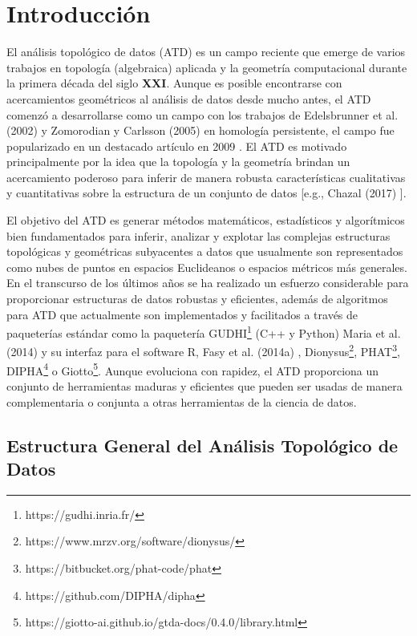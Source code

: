 \chapter*{Introducci\'on}

El an\'alisis topol\'ogico de datos (ATD) es un campo reciente 
que emerge de varios trabajos en topolog\'ia (algebraica) aplicada
y la geometr\'ia computacional durante la primera d\'ecada del siglo \textbf{XXI}. Aunque
es posible encontrarse con acercamientos geom\'etricos al
an\'alisis de datos desde mucho antes, el ATD comenz\'o a desarrollarse
como un campo con los trabajos de Edelsbrunner et al. (2002) \cite{Edelsbrunner2002} y
Zomorodian y Carlsson (2005) \cite{Zomorodian2005} en homolog\'ia persistente, el campo fue
popularizado en un destacado art\'iculo en 2009 \cite{Carlsson2005}.
El ATD es motivado principalmente por la idea que la topolog\'ia y la
geometr\'ia brindan un acercamiento poderoso para inferir de manera robusta
caracter\'isticas cualitativas y cuantitativas sobre la estructura
de un conjunto de datos [e.g., Chazal (2017) \cite{Chazal2017}].

El objetivo del ATD es generar m\'etodos matem\'aticos, estad\'isticos y algor\'itmicos
bien fundamentados para inferir, analizar y explotar las complejas estructuras topol\'ogicas
y geom\'etricas subyacentes a datos que usualmente son representados como nubes de puntos en
espacios Euclideanos o espacios m\'etricos m\'as generales. En el transcurso de los \'ultimos
a\~{n}os se ha realizado un esfuerzo considerable para proporcionar estructuras de datos robustas
y eficientes, adem\'as de algoritmos para ATD que actualmente son implementados y
facilitados a trav\'es de paqueter\'ias est\'andar como la paqueter\'ia
GUDHI\footnote{https://gudhi.inria.fr/} (C++ y Python) Maria et al. (2014) \cite{Maria2014} y su
interfaz para el software R, Fasy et al. (2014a) \cite{Fasy2014a},
Dionysus\footnote{https://www.mrzv.org/software/dionysus/},
PHAT\footnote{https://bitbucket.org/phat-code/phat},
DIPHA\footnote{https://github.com/DIPHA/dipha} o
Giotto\footnote{https://giotto-ai.github.io/gtda-docs/0.4.0/library.html}.
Aunque evoluciona con rapidez, el ATD proporciona un conjunto de herramientas maduras y
eficientes que pueden ser usadas de manera complementaria o conjunta a otras herramientas
de la ciencia de datos.

\section*{Estructura General del An\'alisis Topol\'ogico de Datos}

